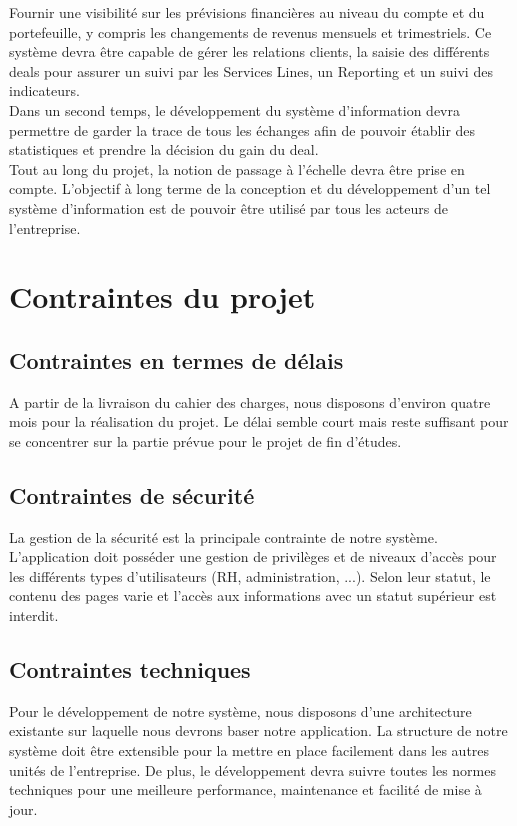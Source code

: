 Fournir une visibilité sur les prévisions financières au niveau du compte et du portefeuille, y compris les changements de revenus mensuels et trimestriels. Ce système devra être capable de gérer les relations clients, la saisie des différents deals pour assurer un suivi par les Services Lines, un Reporting et un suivi des indicateurs.
\\

Dans un second temps, le développement du système d’information devra permettre
de garder la trace de tous les échanges afin de pouvoir établir des statistiques et prendre la décision du gain du deal. 
\\

Tout au long du projet, la notion de passage à l’échelle devra être prise en compte. L’objectif à long terme de la conception et du développement d’un tel système d’information est de pouvoir être utilisé par tous les acteurs de l’entreprise.

\section{Contraintes du projet}

\subsection{Contraintes en termes de délais}
A partir de la livraison du cahier des charges, nous disposons d’environ quatre mois pour la réalisation du projet. Le délai semble court mais reste suffisant pour se concentrer sur la partie prévue pour le projet de fin d’études.

\subsection{Contraintes de sécurité}
La gestion de la sécurité est la principale contrainte de notre système. L'application doit posséder une gestion de privilèges et de niveaux d'accès pour les différents types d'utilisateurs (RH, administration, ...). Selon leur statut, le contenu des pages varie et l'accès aux informations avec un statut supérieur est interdit.

\subsection{Contraintes techniques}

Pour le développement de notre système, nous disposons d’une architecture
existante sur laquelle nous devrons baser notre application. La structure de notre système doit être extensible pour la mettre en place facilement dans les autres unités de l’entreprise. De plus, le développement devra suivre toutes les normes techniques pour une meilleure performance, maintenance et facilité de mise à jour.